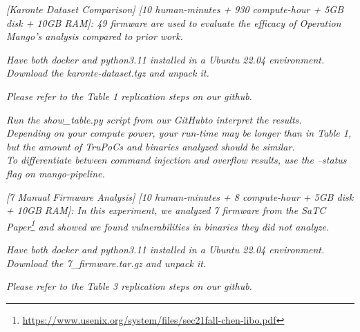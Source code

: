 \begin{compactdesc}

    \item[(E1):] \textit{[Karonte Dataset Comparison] [10 human-minutes + 930 compute-hour + 5GB disk + 10GB RAM]:
    49 firmware are used to evaluate the efficacy of Operation Mango's analysis compared to prior work.}

    \begin{asparadesc}

        \item[Preparation:] \textit{Have both docker and python3.11 installed in a Ubuntu 22.04 environment.
        Download the karonte-dataset.tgz and unpack it.}

        \item[How to:]  \textit{Please refer to the Table 1 replication steps on our github\footnotemark[1].}

        \item[Results:] \textit{
            Run the show\_table.py script from our GitHub\footnotemark[1] to interpret the results. \\
            Depending on your compute power, your run-time may be longer than in Table 1, but the amount of TruPoCs and binaries analyzed should be similar. \\
            To differentiate between command injection and overflow results, use the \textit{--status} flag on \textit{mango-pipeline}.
        }
    \end{asparadesc}

    \item[(E2):] \textit{[7 Manual Firmware Analysis] [10 human-minutes + 8 compute-hour + 5GB disk + 10GB RAM]: 
    In this experiment, we analyzed 7 firmware from the SaTC Paper\footnote{\url{https://www.usenix.org/system/files/sec21fall-chen-libo.pdf}} and showed we found vulnerabilities in binaries they did not analyze.}

    \begin{asparadesc}
        \item[Preparation:] \textit{Have both docker and python3.11 installed in a Ubuntu 22.04 environment.
        Download the 7\_firmware.tar.gz and unpack it.}

        \item[How to:]  \textit{Please refer to the Table 3 replication steps on our github\footnotemark[1].}


\end{asparadesc}
\end{compactdesc}
